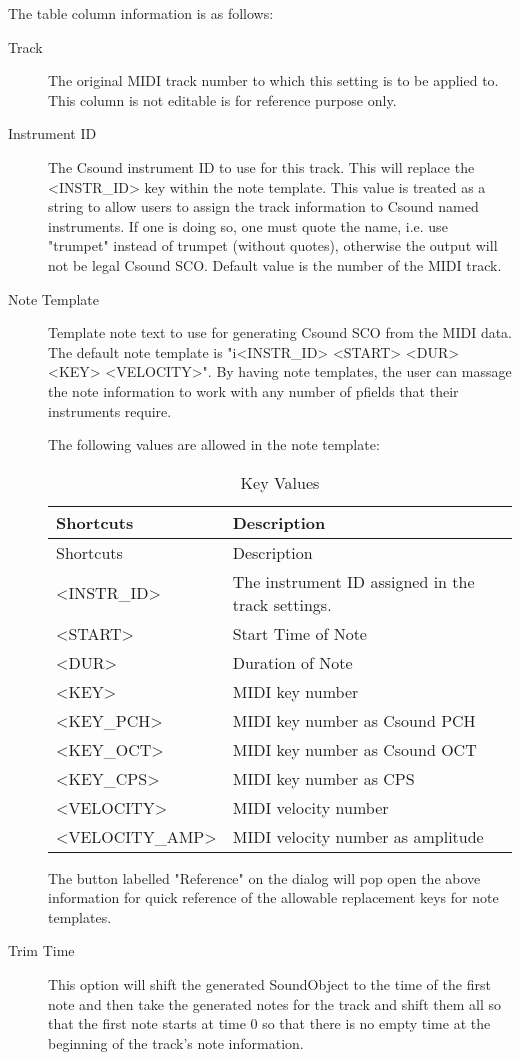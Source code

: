 The table column information is as follows:

\begin{description}
\item[Track]
The original MIDI track number to which this setting is to be applied
to. This column is not editable is for reference purpose only.
\item[Instrument ID]
The Csound instrument ID to use for this track. This will replace the
\textless{}INSTR\_ID\textgreater{} key within the note template. This
value is treated as a string to allow users to assign the track
information to Csound named instruments. If one is doing so, one must
quote the name, i.e. use "trumpet" instead of trumpet (without quotes),
otherwise the output will not be legal Csound SCO. Default value is the
number of the MIDI track.
\item[Note Template]
Template note text to use for generating Csound SCO from the MIDI data.
The default note template is "i\textless{}INSTR\_ID\textgreater{}
\textless{}START\textgreater{} \textless{}DUR\textgreater{}
\textless{}KEY\textgreater{} \textless{}VELOCITY\textgreater{}". By
having note templates, the user can massage the note information to work
with any number of pfields that their instruments require.

The following values are allowed in the note template:

\begin{longtable}[]{@{}ll@{}}
\caption{Key Values}\tabularnewline
\toprule
Shortcuts & Description\tabularnewline
\midrule
\endfirsthead
\toprule
Shortcuts & Description\tabularnewline
\midrule
\endhead
\textless{}INSTR\_ID\textgreater{} & The instrument ID assigned in the
track settings.\tabularnewline
\textless{}START\textgreater{} & Start Time of Note\tabularnewline
\textless{}DUR\textgreater{} & Duration of Note\tabularnewline
\textless{}KEY\textgreater{} & MIDI key number\tabularnewline
\textless{}KEY\_PCH\textgreater{} & MIDI key number as Csound
PCH\tabularnewline
\textless{}KEY\_OCT\textgreater{} & MIDI key number as Csound
OCT\tabularnewline
\textless{}KEY\_CPS\textgreater{} & MIDI key number as
CPS\tabularnewline
\textless{}VELOCITY\textgreater{} & MIDI velocity number\tabularnewline
\textless{}VELOCITY\_AMP\textgreater{} & MIDI velocity number as
amplitude\tabularnewline
\bottomrule
\end{longtable}

The button labelled "Reference" on the dialog will pop open the above
information for quick reference of the allowable replacement keys for
note templates.
\item[Trim Time]
This option will shift the generated SoundObject to the time of the
first note and then take the generated notes for the track and shift
them all so that the first note starts at time 0 so that there is no
empty time at the beginning of the track's note information.
\end{description}

